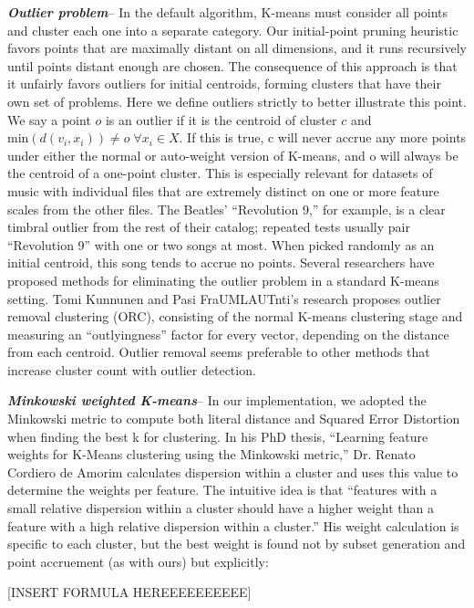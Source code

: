 \documentclass[10pt,twocolumn]{article}
\begin{document}
\emph{\textbf{Outlier problem}}-- In the default algorithm, K-means must consider all points and cluster each one into a separate category. Our initial-point pruning heuristic favors points that are maximally distant on all dimensions, and it runs recursively until points distant enough are chosen. The consequence of this approach is that it unfairly favors outliers for initial centroids, forming clusters that have their own set of problems. Here we define outliers strictly to better illustrate this point. We say a point $o$ is an outlier if it is the centroid of cluster $c$ and $\mathrm{min}(d(v_i, x_i)) \neq o \; \forall x_i \in X$. If this is true, c will never accrue any more points under either the normal or auto-weight version of K-means, and o will always be the centroid of a one-point cluster. This is especially relevant for datasets of music with individual files that are extremely distinct on one or more feature scales from the other files. The Beatles’ “Revolution 9,” for example, is a clear timbral outlier from the rest of their catalog; repeated tests usually pair “Revolution 9” with one or two songs at most. When picked randomly as an initial centroid, this song tends to accrue no points.
Several researchers have proposed methods for eliminating the outlier problem in a standard K-means setting. Tomi Kunnunen and Pasi FraUMLAUTnti’s research proposes outlier removal clustering (ORC), consisting of the normal K-means clustering stage and measuring an “outlyingness” factor for every vector, depending on the distance from each centroid. \cite{OutlierRemoval} \cite{Marghny} Outlier removal seems preferable to other methods that increase cluster count with outlier detection. 

\emph{\textbf{Minkowski weighted K-means}}-- In our implementation, we adopted the Minkowski metric to compute both literal distance and Squared Error Distortion when finding the best k for clustering. In his PhD thesis, “Learning feature weights for K-Means clustering using the Minkowski metric,” Dr. Renato Cordiero de Amorim calculates dispersion within a cluster and uses this value to determine the weights per feature. The intuitive idea is that “features with a small relative dispersion within a cluster should have a higher weight than a feature with a high relative dispersion within a cluster.” \cite{MinkWeightedK} His weight calculation is specific to each cluster, but the best weight is found not by subset generation and point accruement (as with ours) but explicitly: 

[INSERT FORMULA HEREEEEEEEEEE]
\end{document}
